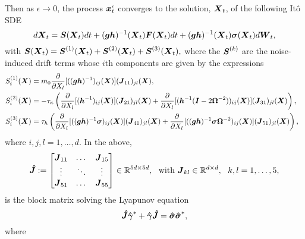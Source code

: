 \begin{corollary}
Then as $\epsilon \to 0$, the process $\boldsymbol{x}^\epsilon_{t}$ converges to the solution, $\boldsymbol{X}_{t}$, of the following It\^o SDE
\begin{equation} \label{limitSDE}
d\boldsymbol{X}_{t} = \boldsymbol{S}(\boldsymbol{X}_{t}) dt + (\boldsymbol{g}\boldsymbol{h})^{-1}(\boldsymbol{X}_{t})\boldsymbol{F}(\boldsymbol{X}_{t}) dt + (\boldsymbol{g} \boldsymbol{h})^{-1}(\boldsymbol{X}_{t}) \boldsymbol{\sigma}(\boldsymbol{X}_{t}) d\boldsymbol{W}_{t},
\end{equation}
with $\boldsymbol{S}(\boldsymbol{X}_{t}) = \boldsymbol{S}^{(1)}(\boldsymbol{X}_{t}) + \boldsymbol{S}^{(2)}(\boldsymbol{X}_{t}) + \boldsymbol{S}^{(3)}(\boldsymbol{X}_{t}),$ where the $\boldsymbol{S}^{(k)}$ are the noise-induced drift terms whose $i$th components are given by the expressions
\begin{align}
S^{(1)}_{i}(\vecc{X})  &= m_{0} \frac{\partial}{\partial X_{l}}[((\vecc{g}\vecc{h})^{-1})_{ij}(\vecc{X})] (\vecc{J}_{11})_{jl}(\vecc{X}), \label{hnid1} \\ 
S^{(2)}_{i}(\vecc{X})  &= -\tau_{\kappa}\left( \frac{\partial}{\partial X_{l}}[( \vecc{h}^{-1})_{ij}(\vecc{X})]   (\vecc{J}_{21})_{jl}(\vecc{X}) + \frac{\partial}{\partial X_{l}}[( \vecc{h}^{-1} (\vecc{I}-2\vecc{\Omega}^{-2}))_{ij}(\vecc{X})] (\vecc{J}_{31})_{jl}(\vecc{X}) \right), \label{hnid2} \\ 
S^{(3)}_{i}(\vecc{X}) &= \tau_{h} \left(\frac{\partial}{\partial X_{l}}[((\vecc{g}\vecc{h})^{-1} \vecc{\sigma})_{ij}(\vecc{X})] (\vecc{J}_{41})_{jl}(\vecc{X}) +  \frac{\partial}{\partial X_{l}}[((\vecc{g}\vecc{h})^{-1} \vecc{\sigma} \vecc{\Omega}^{-2} )_{ij}(\vecc{X})] (\vecc{J}_{51})_{jl}(\vecc{X}) \right), \ \  \label{hnid3}
\end{align} 
where $i,j,l = 1, \dots, d$.
In the above,
\begin{equation} \boldsymbol{\hat{J}} := \begin{bmatrix}
    \boldsymbol{J}_{11}       & \dots & \boldsymbol{J}_{15} \\
    \vdots       & \ddots & \vdots \\
    \boldsymbol{J}_{51}       & \dots & \boldsymbol{J}_{55} 
\end{bmatrix} \in \mathbb{R}^{5d \times 5d},  \ \text{ with } \boldsymbol{J}_{kl} \in \mathbb{R}^{d \times d}, \ \ k,l = 1,\dots,5,\end{equation} is the block matrix solving the Lyapunov equation \begin{equation} \boldsymbol{\hat{J}} \boldsymbol{\hat{\gamma}}^{*} + \boldsymbol{\hat{\gamma}} \boldsymbol{\hat{J}} = \boldsymbol{\hat{\sigma}} \boldsymbol{\hat{\sigma}}^{*}, \end{equation}
where 
\begin{equation} \label{hcase2}

\end{equation}
\end{corollary}
